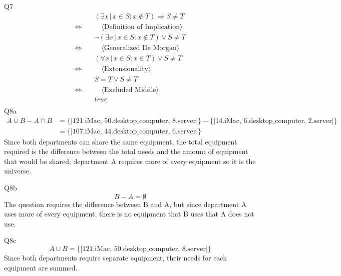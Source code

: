 \documentclass{article}
\begin{document}
    \vspace{10mm}
    Q7
    \begin{align*}
        & \quad (\exists x\, |\, x \in S : x \notin T) \Longrightarrow S \neq T \\
        \Longleftrightarrow & \qquad \langle \text{Definition of Implication} \rangle \\
        & \quad \neg(\exists x\, |\, x \in S : x \notin T) \vee S \neq T \\
        \Longleftrightarrow & \qquad \langle \text{Generalized De Morgan} \rangle \\
        & \quad (\forall x\, |\, x \in S : x \in T) \vee S \neq T \\
        \Longleftrightarrow & \qquad \langle \text{Extensionality} \rangle \\
        & \quad S = T \vee S \neq T \\
        \Longleftrightarrow & \qquad \langle \text{Excluded Middle} \rangle \\
        & \quad true \\
    \end{align*}
    \vspace{10mm}
    Q8a
    \begin{equation*}
       \begin{split}
            A\cup B - A\cap B &= \{\!| \text{121.iMac, 50.desktop} \_ \text{computer, 8.server} |\!\} - \{\!| \text{14.iMac, 6.desktop} \_ \text{computer, 2.server} |\!\} \\
            &= \{\!| \text{107.iMac, 44.desktop} \_ \text{computer, 6.server} |\!\}
       \end{split}
    \end{equation*}
    Since both departments can share the same equipment, the total equipment required is the difference between the total needs and the amount of equipment that would be shared; department A requires more of every equipment so it is the universe.

    \vspace{10mm}
    Q8b
    \begin{equation*}
        B - A = \emptyset
    \end{equation*}
    The question requires the difference between B and A, but since department A uses more of every equipment, there is no equipment that B uses that A does not use.

    \vspace{10mm}
    Q8c
    \begin{equation*}
        A \cup B = \{\!| \text{121.iMac, 50.desktop} \_ \text{computer, 8.server} |\!\}
    \end{equation*}
    Since both departments require separate equipment, their needs for each equipment are summed.
\end{document}
